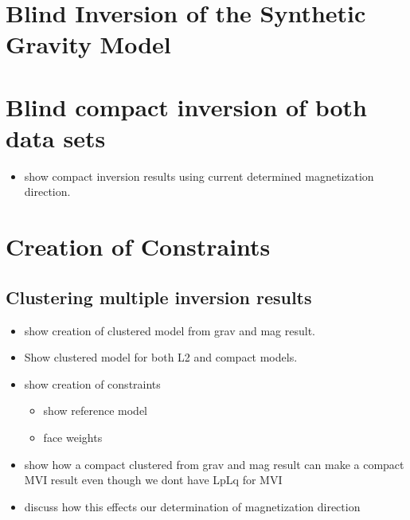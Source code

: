 
\FloatBarrier
\section{Blind Inversion of the Synthetic Gravity Model}
\label{sec:Blind Inversion of the Synthetic Gravity Model:TKC}



\section{Blind compact inversion of both data sets}

\begin{itemize}
\item show compact inversion results using current determined magnetization direction.
\end{itemize}

\section{Creation of Constraints }
\label{sec:Creation of Constraints:TKC}

\subsection{Clustering multiple inversion results}
\label{sec:clusterTKC}

\begin{itemize}
\item show creation  of clustered model from grav and mag result. 
\item Show clustered model for both L2 and compact models.
\item show creation of constraints
\begin{itemize}
\item show reference model
\item face weights
\end{itemize}
\item show how a compact clustered from grav and mag result can make a compact MVI result even though we dont have LpLq for MVI
\item discuss how this effects our determination of magnetization direction
\end{itemize}

